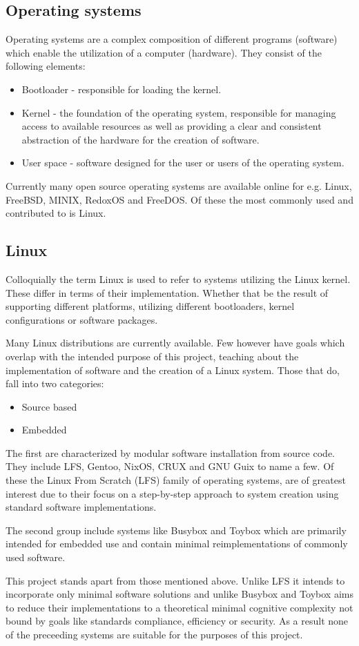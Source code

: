 \subsection{Operating systems}

Operating systems are a complex composition of different programs (software) which enable the utilization of a computer (hardware). They consist of the following elements:

\begin{itemize}
    \item Bootloader - responsible for loading the kernel.
    \item Kernel - the foundation of the operating system, responsible for managing access to available resources as well as providing a clear and consistent abstraction of the hardware for the creation of software.
    \item User space - software designed for the user or users of the operating system.
\end{itemize}

Currently many open source operating systems are available online for e.g. Linux, FreeBSD, MINIX, RedoxOS and FreeDOS. Of these the most commonly used and contributed to is Linux.

\subsection{Linux}

Colloquially the term Linux is used to refer to systems utilizing the Linux kernel. These differ in terms of their implementation. Whether that be the result of supporting different platforms, utilizing different bootloaders, kernel configurations or software packages.

Many Linux distributions are currently available. Few however have goals which overlap with the intended purpose of this project, teaching about the implementation of software and the creation of a Linux system. Those that do, fall into two categories:

\begin{itemize}
    \item Source based
    \item Embedded
\end{itemize}

The first are characterized by modular software installation from source code. They include LFS, Gentoo, NixOS, CRUX and GNU Guix to name a few. Of these the Linux From Scratch (LFS) family of operating systems, are of greatest interest due to their focus on a step-by-step approach to system creation using standard software implementations. 

The second group include systems like Busybox and Toybox which are primarily intended for embedded use and contain minimal reimplementations of commonly used software.

This project stands apart from those mentioned above. Unlike LFS it intends to incorporate only minimal software solutions and unlike Busybox and Toybox aims to reduce their implementations to a theoretical minimal cognitive complexity not bound by goals like standards compliance, efficiency or security. As a result none of the preceeding systems are suitable for the purposes of this project.
